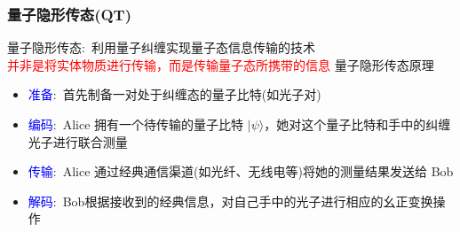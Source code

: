 \begin{frame}
	\frametitle{量子隐形传态\textrm{(QT)}}
        量子隐形传态:~利用量子纠缠实现量子态信息传输的技术\\
	\textcolor{red}{并非是将实体物质进行传输，而是传输量子态所携带的信息}
	\vskip 2pt
    量子隐形传态原理
    \begin{itemize}
	    \item \textcolor{blue}{准备}:~首先制备一对处于纠缠态的量子比特(如光子对)\\
		    {\fontsize{7.5pt}{5.2pt}}
	    \item \textcolor{blue}{编码}:~\textrm{Alice} 拥有一个待传输的量子比特 \( |\psi\rangle \)，她对这个量子比特和手中的纠缠光子进行联合测量\\
		    {\fontsize{7.5pt}{5.2pt}}
	    \item \textcolor{blue}{传输}:~\textrm{Alice} 通过经典通信渠道(如光纤、无线电等)将她的测量结果发送给 \textrm{Bob}
	    \item \textcolor{blue}{解码}:~\textrm{Bob}根据接收到的经典信息，对自己手中的光子进行相应的幺正变换操作\\
		    {\fontsize{7.5pt}{5.2pt}\selectfont{使该光子的状态变为 \( |\psi\rangle \)，实现了量子态的传输}}
    \end{itemize}
\end{frame}

